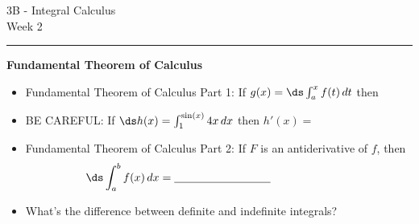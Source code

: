 \documentclass[12pt,letterpaper]{article}
\begin{document}
\pagestyle{fancy}
\begin{center}
3B - Integral Calculus \\
Week 2 %
\end{center}

\hrule

\begin{comment}
\begin{center}
\begin{tabular}{|rl|}
\hline
\multicolumn{2}{|c|}{Contact Information} \\
\hline
\bf{TA's name:} & Trevor Klar \\
\bf{Email:} & trevorklar@math.ucsb.edu \\
\bf{Office hours:} & Mondays 2:00-3:00 \\
\bf{Math Lab hours:} & Wednesdays 12:00-2:00 \\
\bf{Office:} & South Hall 6431x \\
\hline
\end{tabular}
\end{center}
\end{comment}


\noindent\textbf{Fundamental Theorem of Calculus}

\begin{itemize}

\item Fundamental Theorem of Calculus Part 1: If $g(x) = \ds \int_{a}^x f(t) \, dt$ then \hrulefill %

\item BE CAREFUL: If $\ds h(x) = \int^{\sin(x)}_1 4x \, dx $ then $h'(x) = $ \underline{\hspace{3cm}}

\item Fundamental Theorem of Calculus Part 2: If $F$ is an antiderivative of $f$, then $$\hspace{-1in}\ds \int_a^b f(x) \, dx = \text{\underline{\hspace{3cm}}}$$%

\item What's the difference between definite and indefinite integrals? \hrulefill 
\\ \mbox{} \hrulefill

\end{itemize}
\end{document}
